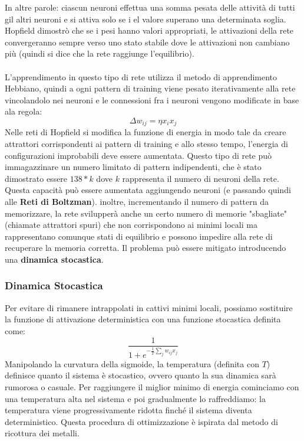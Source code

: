 \documentclass[12pt, a4paper]{article}
\begin{document}
In altre parole: ciascun neuroni effettua una somma pesata delle attività di tutti gil altri neuroni e si attiva solo se i el valore superano una determinata soglia.\\
Hopfield dimostrò che se i pesi hanno valori appropriati, le attivazioni della rete convergeranno sempre verso uno stato stabile dove le attivazioni non cambiano più (quindi si dice che la rete raggiunge l'equilibrio).\\
\\
L'apprendimento in questo tipo di rete utilizza il metodo di apprendimento Hebbiano, quindi a ogni pattern di training viene pesato iterativamente alla rete vincolandolo nei neuroni e le connessioni fra i neuroni vengono modificate in base ala regola:
\[\Delta w_{ij}=\eta x_ix_j\]
Nelle reti di Hopfield si modifica la funzione di energia in modo tale da creare attrattori corrispondenti ai pattern di training e allo stesso tempo, l'energia di configurazioni improbabili deve essere aumentata.
Questo tipo di rete può immagazzinare un numero limitato di pattern indipendenti, che è stato dimostrato essere \(138*k\) dove \(k\) rappresenta il numero di neuroni della rete. Questa capacità può essere aumentata aggiungendo neuroni (e passando quindi alle \textbf{Reti di Boltzman}). inoltre, incrementando il numero di pattern da memorizzare, la rete svilupperà anche un certo numero di memorie "sbagliate" (chiamate attrattori spuri) che non corrispondono ai minimi locali ma rappresentano comunque stati di equilibrio e possono impedire alla rete di recuperare la memoria corretta. Il problema può essere mitigato introducendo una \textbf{dinamica stocastica}.\\

\subsubsection{Dinamica Stocastica}
Per evitare di rimanere intrappolati in cattivi minimi locali, possiamo sostituire la funzione di attivazione deterministica con una funzione stocastica definita come:
\[\frac{1}{1+e^{-\frac{1}{T} \sum_j w_{ij}x_j}}\]
Manipolando la curvatura della sigmoide, la temperatura (definita con \(T\)) definisce quanto il sistema è stocastico, ovvero quanto la sua dinamica sarà rumorosa o casuale.
Per raggiungere il miglior minimo di energia cominciamo con una temperatura alta nel sistema e poi gradualmente lo raffreddiamo: la temperatura viene progressivamente ridotta finché il sistema diventa deterministico. Questa procedura di ottimizzazione è ispirata dal metodo di ricottura dei metalli. 
\end{document}
